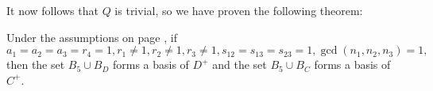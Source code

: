 It now follows that $Q$ is trivial, so we have proven the following theorem:
\begin{theorem}
Under the assumptions on page \pageref{assum}, if $$a_1=a_2=a_3=r_4=1, r_1\neq 1, r_2\neq 1, r_3 \neq 1,s_{12}=s_{13}=s_{23}=1,\gcd(n_1,n_2,n_3)=1,$$ then  the set $B_{5}\cup B_D$ forms a basis of $D^+$ and the set $B_{5}\cup B_C$ forms a basis of $C^+$.
\end{theorem}
